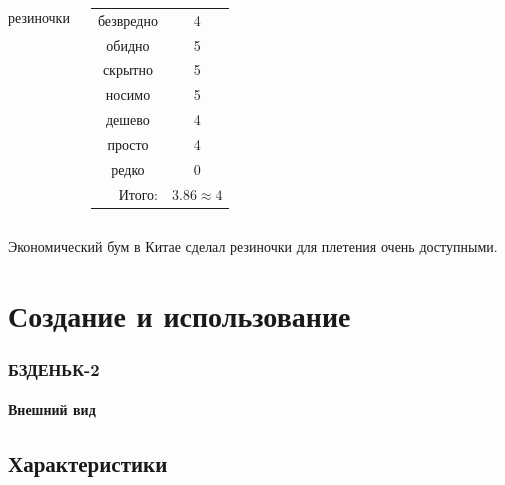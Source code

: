 \begin{frame} %
    \begin{columns}
            резиночки
            
            \begin{center}
                \begin{tabular}{c|c}
                    \hline
                    безвредно                   & 4 \\
                    обидно                      & 5 \\
                    скрытно                     & 5 \\
                    носимо                      & 5 \\
                    дешево                      & 4 \\
                    просто                      & 4 \\ 
                    редко                       & 0 \\ \hline
                    \multicolumn{1}{r|}{Итого:} & $3.86\approx 4$ \\
                \end{tabular}
            \end{center}
    \end{columns}    
\end{frame}

Экономический бум в Китае сделал резиночки для плетения очень доступными.


\section{Создание и использование}

\begin{frame}
    \frametitle{БЗДЕНЬК-2}
    \framesubtitle{Внешний вид}
    
\end{frame}


\subsection{Характеристики}

